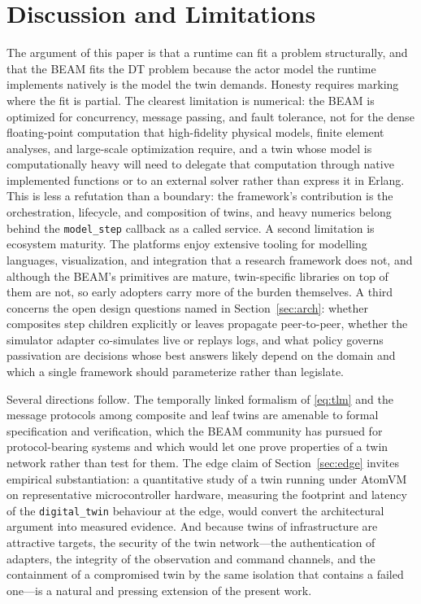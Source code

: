 \documentclass[conference]{IEEEtran}
\newcommand{\beam}{BEAM\xspace}
\newcommand{\dt}{DT\xspace}
\begin{document}
\section{Discussion and Limitations}
\label{sec:disc}
The argument of this paper is that a runtime can fit a problem structurally, and
that the \beam fits the \dt problem because the actor model the runtime
implements natively is the model the twin demands. Honesty requires marking
where the fit is partial. The clearest limitation is numerical: the \beam is
optimized for concurrency, message passing, and fault tolerance, not for the
dense floating-point computation that high-fidelity physical models, finite
element analyses, and large-scale optimization require, and a twin whose model
is computationally heavy will need to delegate that computation through native
implemented functions or to an external solver rather than express it in Erlang.
This is less a refutation than a boundary: the framework's contribution is the
orchestration, lifecycle, and composition of twins, and heavy numerics belong
behind the \texttt{model\_step} callback as a called service. A second
limitation is ecosystem maturity. The platforms enjoy extensive tooling for
modelling languages, visualization, and integration that a research framework
does not, and although the \beam's primitives are mature, twin-specific
libraries on top of them are not, so early adopters carry more of the burden
themselves. A third concerns the open design questions named in
Section~\ref{sec:arch}: whether composites step children explicitly or leaves
propagate peer-to-peer, whether the simulator adapter co-simulates live or
replays logs, and what policy governs passivation are decisions whose best
answers likely depend on the domain and which a single framework should
parameterize rather than legislate.

Several directions follow. The temporally linked formalism of \eqref{eq:tlm}
and the message protocols among composite and leaf twins are amenable to formal
specification and verification, which the \beam community has pursued for
protocol-bearing systems and which would let one prove properties of a twin
network rather than test for them. The edge claim of Section~\ref{sec:edge}
invites empirical substantiation: a quantitative study of a twin running under
AtomVM on representative microcontroller hardware, measuring the footprint and
latency of the \texttt{digital\_twin} behaviour at the edge, would convert the
architectural argument into measured evidence. And because twins of
infrastructure are attractive targets, the security of the twin network---the
authentication of adapters, the integrity of the observation and command
channels, and the containment of a compromised twin by the same isolation that
contains a failed one---is a natural and pressing extension of the present work.
\end{document}
